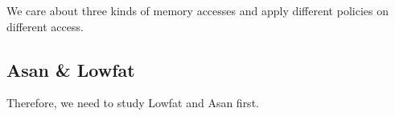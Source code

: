 We care about three kinds of memory accesses and apply different policies on different access.

\subsection{Asan \& Lowfat}
Therefore, we need to study Lowfat and Asan first.



















